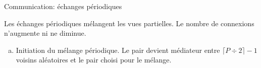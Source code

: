 \begin{frame}{Communication}{\SPRAY : échanges périodiques}
 
  Les échanges périodiques mélangent les vues partielles. Le nombre de
  connexions n'augmente ni ne diminue.
 
  \vspace{0.5cm}

  \begin{minipage}{0.6\textwidth}
    \begin{enumerate}[(a)]
    \item Initiation du mélange périodique. Le pair devient médiateur entre
      $\lceil P \div 2 \rceil - 1$ voisins aléatoires et le pair choisi pour le
      mélange. 
    \end{enumerate}
  \end{minipage}
  \begin{minipage}{0.37\textwidth}
    \begin{center}
      
    \end{center}
  \end{minipage}


  \vspace{0.5cm}
  \large
  \begin{itemize}
  \end{itemize}
  
\end{frame}

